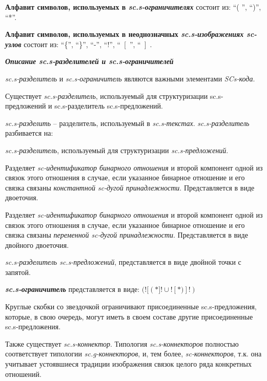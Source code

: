 \textbf{Алфавит символов, используемых в \textit{sc.s-ограничителях}} состоит из: ``( ''{}, ``)''{}, ``*''{}.

\textbf{Алфавит символов, используемых в неоднозначных \textit{sc.s-изображениях sc-узлов}} состоит из:
``\{''{}, ``\}''{}, 
``-''{}, ``!''{}, ``~[ \,''{}, ``~] \,{}.

\bigskip
\textbf{\textit{Описание sc.s-разделителей и sc.s-ограничителей}}

\textit{sc.s-разделитель} и \textit{sc.s-ограничитель} являются важными элементами \textit{SCs-кода}.

Существует \textit{sc.s-разделитель}, используемый для структуризации sc.s-предложений и sc.s-разделитель sc.s-предложений.

\textit{sc.s-разделить} -- разделитель, используемый в \textit{sc.s-текстах}. \textit{sc.s-разделитель} разбивается на:
\begin{textitemize}
	\item \textit{sc.s-разделитель}, используемый для структуризации \textit{\textit{sc.s-предложений}}.
	\begin{textitemize}
		\item Разделяет \textit{sc-идентификатор бинарного отношения} и второй компонент одной из связок этого отношения в случае, если указанное бинарное отношение и его связка связаны \textit{константной sc-дугой принадлежности}. Представляется в виде двоеточия.

		\item Разделяет \textit{sc-идентификатор бинарного отношения} и второй компонент одной из связок этого отношения в случае, если указанное бинарное отношение и его связка связаны \textit{переменной sc-дугой принадлежности}. Представляется в виде двойного двоеточия.
		
	\end{textitemize}
	\item  \textit{sc.s-разделитель \textit{sc.s-предложений}}, представляется в виде двойной точки с запятой.    
\end{textitemize}

\bigskip
\textbf{\textit{sc.s-ограничитель}} представляется в виде: $(![  (\ast ]! \cup ![  \ast) ]!)$

Круглые скобки со звездочкой ограничивают присоединенные sc.s-предложения, которые, в свою очередь, могут иметь в своем составе другие присоединенные sc.s-предложения.

Также существует \textit{\textit{sc.s-коннектор}}. Типология \textit{\textit{sc.s-коннектор}ов} полностью соответствует типологии \textit{sc.g-коннекторов}, и, тем более, \textit{sc-коннекторов}, т.к. она учитывает устоявшиеся традиции изображения связок целого ряда конкретных отношений.

